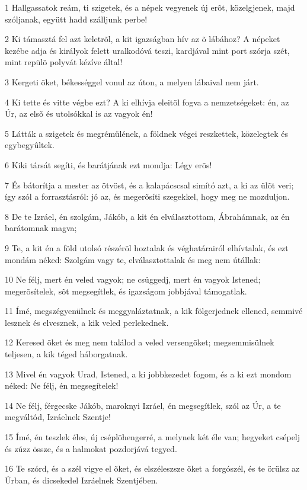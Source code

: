 \par 1 Hallgassatok reám, ti szigetek, és a népek vegyenek új erõt, közelgjenek, majd szóljanak, együtt hadd szálljunk perbe!
\par 2 Ki támasztá fel azt keletrõl, a kit igazságban hív az õ lábához? A népeket kezébe adja és királyok felett uralkodóvá teszi, kardjával mint port szórja szét, mint repülõ polyvát kézíve által!
\par 3 Kergeti õket, békességgel vonul az úton, a melyen lábaival nem járt.
\par 4 Ki tette és vitte végbe ezt? A ki elhívja eleitõl fogva a nemzetségeket: én, az Úr, az elsõ és utolsókkal is az vagyok én!
\par 5 Látták a szigetek és megrémülének, a földnek végei reszkettek, közelegtek és egybegyûltek.
\par 6 Kiki társát segíti, és barátjának ezt mondja: Légy erõs!
\par 7 És bátorítja a mester az ötvöst, és a kalapácscsal simító azt, a ki az ülõt veri; így szól a forrasztásról: jó az, és megerõsíti szegekkel, hogy meg ne mozduljon.
\par 8 De te Izráel, én szolgám, Jákób, a kit én elválasztottam, Ábrahámnak, az én barátomnak magva;
\par 9 Te, a kit én a föld utolsó részérõl hoztalak és véghatárairól elhívtalak, és ezt mondám néked: Szolgám vagy te, elválasztottalak és meg nem útállak:
\par 10 Ne félj, mert én veled vagyok; ne csüggedj, mert én vagyok Istened; megerõsítelek, sõt megsegítlek, és igazságom jobbjával támogatlak.
\par 11 Ímé, megszégyenülnek és meggyaláztatnak, a kik fölgerjednek ellened, semmivé lesznek és elvesznek, a kik veled perlekednek.
\par 12 Keresed õket és meg nem találod a veled versengõket; megsemmisülnek teljesen, a kik téged háborgatnak.
\par 13 Mivel én vagyok Urad, Istened, a ki jobbkezedet fogom, és a ki ezt mondom néked: Ne félj, én megsegítelek!
\par 14 Ne félj, férgecske Jákób, maroknyi Izráel, én megsegítlek, szól az Úr, a te megváltód, Izráelnek Szentje!
\par 15 Ímé, én teszlek éles, új cséplõhengerré, a melynek két éle van; hegyeket csépelj és zúzz össze, és a halmokat pozdorjává tegyed.
\par 16 Te szórd, és a szél vigye el õket, és elszéleszsze õket a forgószél, és te örülsz az Úrban, és dicsekedel Izráelnek Szentjében.
